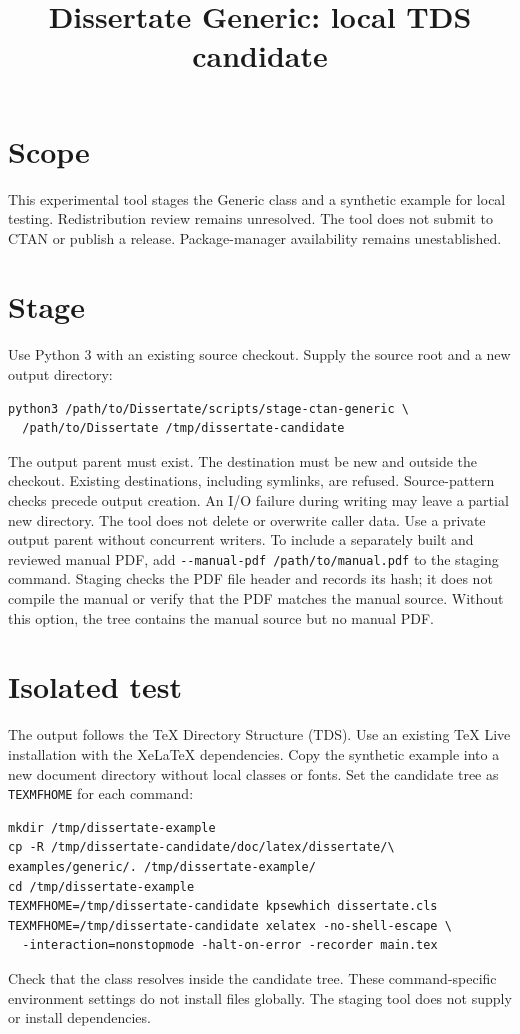 \documentclass[10pt,letterpaper]{article}
\title{Dissertate Generic: local TDS candidate}
\author{}
\date{}
\begin{document}
\maketitle
\section*{Scope}
This experimental tool stages the Generic class and a synthetic example for local testing. Redistribution review remains unresolved. The tool does not submit to CTAN or publish a release. Package-manager availability remains unestablished.
\section*{Stage}
Use Python 3 with an existing source checkout. Supply the source root and a new output directory:
\begin{verbatim}
python3 /path/to/Dissertate/scripts/stage-ctan-generic \
  /path/to/Dissertate /tmp/dissertate-candidate
\end{verbatim}
The output parent must exist. The destination must be new and outside the checkout. Existing destinations, including symlinks, are refused. Source-pattern checks precede output creation. An I/O failure during writing may leave a partial new directory. The tool does not delete or overwrite caller data. Use a private output parent without concurrent writers.
To include a separately built and reviewed manual PDF, add \verb|--manual-pdf /path/to/manual.pdf| to the staging command. Staging checks the PDF file header and records its hash; it does not compile the manual or verify that the PDF matches the manual source. Without this option, the tree contains the manual source but no manual PDF.
\section*{Isolated test}
The output follows the TeX Directory Structure (TDS). Use an existing TeX Live installation with the XeLaTeX dependencies. Copy the synthetic example into a new document directory without local classes or fonts. Set the candidate tree as \texttt{TEXMFHOME} for each command:
\begin{verbatim}
mkdir /tmp/dissertate-example
cp -R /tmp/dissertate-candidate/doc/latex/dissertate/\
examples/generic/. /tmp/dissertate-example/
cd /tmp/dissertate-example
TEXMFHOME=/tmp/dissertate-candidate kpsewhich dissertate.cls
TEXMFHOME=/tmp/dissertate-candidate xelatex -no-shell-escape \
  -interaction=nonstopmode -halt-on-error -recorder main.tex
\end{verbatim}
Check that the class resolves inside the candidate tree. These command-specific environment settings do not install files globally. The staging tool does not supply or install dependencies.
\end{document}
